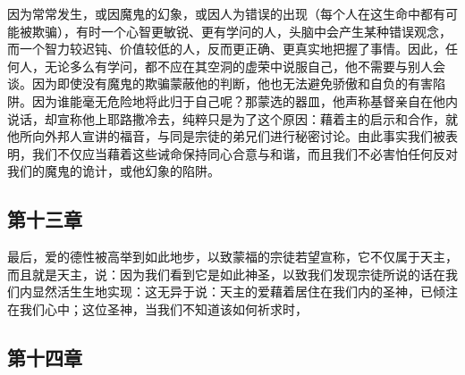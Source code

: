\par

因为常常发生，或因魔鬼的幻象，或因人为错误的出现（每个人在这生命中都有可能被欺骗），有时一个心智更敏锐、更有学问的人，头脑中会产生某种错误观念，而一个智力较迟钝、价值较低的人，反而更正确、更真实地把握了事情。因此，任何人，无论多么有学问，都不应在其空洞的虚荣中说服自己，他不需要与别人会谈。因为即使没有魔鬼的欺骗蒙蔽他的判断，他也无法避免骄傲和自负的有害陷阱。因为谁能毫无危险地将此归于自己呢？那蒙选的器皿，他声称基督亲自在他内说话，却宣称他上耶路撒冷去，纯粹只是为了这个原因：藉着主的启示和合作，就他所向外邦人宣讲的福音，与同是宗徒的弟兄们进行秘密讨论。由此事实我们被表明，我们不仅应当藉着这些诫命保持同心合意与和谐，而且我们不必害怕任何反对我们的魔鬼的诡计，或他幻象的陷阱。\par


\subsection{第十三章}

\par

最后，爱的德性被高举到如此地步，以致蒙福的宗徒若望宣称，它不仅属于天主，而且就是天主，说：因为我们看到它是如此神圣，以致我们发现宗徒所说的话在我们内显然活生生地实现：这无异于说：天主的爱藉着居住在我们内的圣神，已倾注在我们心中；这位圣神，当我们不知道该如何祈求时，\par


\subsection{第十四章}

\par

